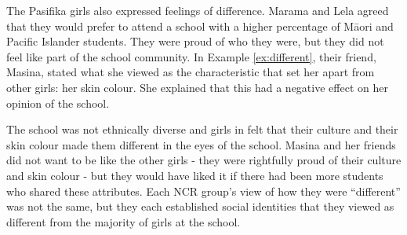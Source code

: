 The Pasifika girls also expressed feelings of difference. Marama and Lela agreed that they would prefer to attend a school with a higher percentage of M\=aori and Pacific Islander students. They were proud of who they were, but they did not feel like part of the school community. In Example \ref{ex:different}, their friend, Masina, stated what she viewed as the characteristic that set her apart from other girls: her skin colour. She explained that this had a negative effect on her opinion of the school.

\label{ex:different}

\vspace{5 mm}

\noindent The school was not ethnically diverse and girls in  felt that their culture and their skin colour made them different in the eyes of the school. Masina and her friends did not want to be like the other girls - they were rightfully proud of their culture and skin colour - but they would have liked it if there had been more students who shared these attributes. Each NCR group's view of how they were ``different'' was not the same, but they each established social identities that they viewed as different from the majority of girls at the school.



